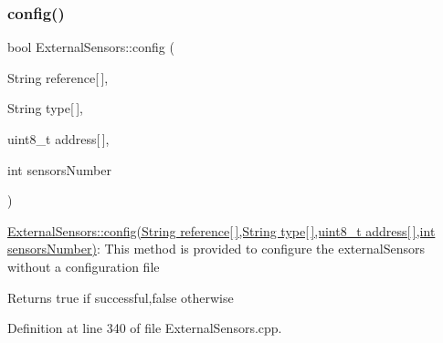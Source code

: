 \subsubsection{\texorpdfstring{config()}{config()}\hspace{0.1cm}{\footnotesize\ttfamily [2/2]}}
{\footnotesize\ttfamily bool External\+Sensors\+::config (\begin{DoxyParamCaption}\item[{String}]{reference\mbox{[}$\,$\mbox{]},  }\item[{String}]{type\mbox{[}$\,$\mbox{]},  }\item[{uint8\+\_\+t}]{address\mbox{[}$\,$\mbox{]},  }\item[{int}]{sensors\+Number }\end{DoxyParamCaption})}

\hyperlink{class_external_sensors_ac829858f587e15a3fcb00567248f0edd}{External\+Sensors\+::config(\+String reference\mbox{[}$\,$\mbox{]},\+String type\mbox{[}$\,$\mbox{]},uint8\+\_\+t address\mbox{[}$\,$\mbox{]},int sensors\+Number)}\+: This method is provided to configure the external\+Sensors without a configuration file

\begin{DoxyReturn}{Returns}
true if successful,false otherwise 
\end{DoxyReturn}


Definition at line 340 of file External\+Sensors.\+cpp.



